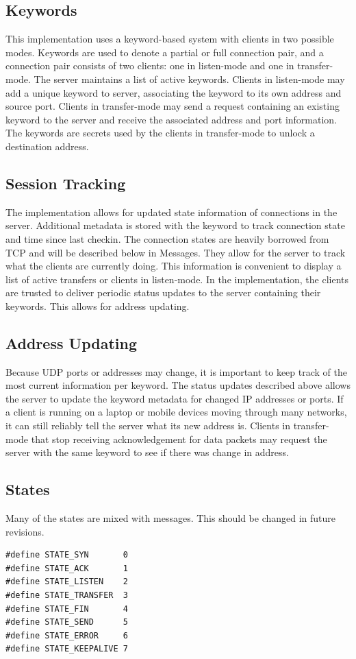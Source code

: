 \documentclass{article}
\begin{document}
\subsection{Keywords}
This implementation uses a keyword-based system with clients in two possible modes. Keywords are used to denote a partial or full connection pair, and a connection pair consists of two clients: one in listen-mode and one in transfer-mode. The server maintains a list of active keywords. Clients in listen-mode may add a unique keyword to server, associating the keyword to its own address and source port. Clients in transfer-mode may send a request containing an existing keyword to the server and receive the associated address and port information. The keywords are secrets used by the clients in transfer-mode to unlock a destination address.

\subsection{Session Tracking}
The implementation allows for updated state information of connections in the server. Additional metadata is stored with the keyword to track connection state and time since last checkin. The connection states are heavily borrowed from TCP and will be described below in Messages. They allow for the server to track what the clients are currently doing. This information is convenient to display a list of active transfers or clients in listen-mode. In the implementation, the clients are trusted to deliver periodic status updates to the server containing their keywords. This allows for address updating.

\subsection{Address Updating}
Because UDP ports or addresses may change, it is important to keep track of the most current information per keyword. The status updates described above allows the server to update the keyword metadata for changed IP addresses or ports. If a client is running on a laptop or mobile devices moving through many networks, it can still reliably tell the server what its new address is. Clients in transfer-mode that stop receiving acknowledgement for data packets may request the server with the same keyword to see if there was change in address. 

\clearpage

\subsection{States}
Many of the states are mixed with messages. This should be changed in future revisions.
\begin{verbatim}
#define STATE_SYN       0
#define STATE_ACK       1
#define STATE_LISTEN    2
#define STATE_TRANSFER  3
#define STATE_FIN       4
#define STATE_SEND      5
#define STATE_ERROR     6
#define STATE_KEEPALIVE 7
\end{verbatim}
\end{document}
